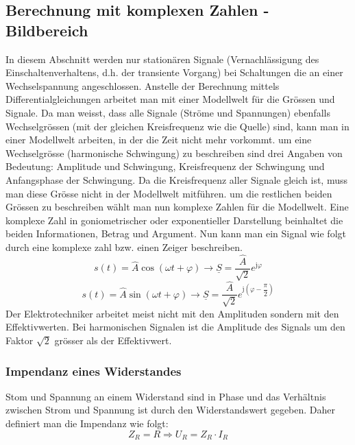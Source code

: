 \subsection{Berechnung mit komplexen Zahlen - Bildbereich}
In diesem Abschnitt werden nur stationären Signale (Vernachlässigung des Einschaltenverhaltens, d.h. der transiente Vorgang) bei Schaltungen die an einer Wechselspannung angeschlossen. Anstelle der Berechnung mittels Differentialgleichungen arbeitet man mit einer Modellwelt für die Grössen und Signale. Da man weisst, dass alle Signale (Ströme und Spannungen) ebenfalls Wechselgrössen (mit der gleichen Kreisfrequenz wie die Quelle) sind, kann man in einer Modellwelt arbeiten, in der die Zeit nicht mehr vorkommt. um eine Wechselgrösse (harmonische Schwingung) zu beschreiben sind drei Angaben von Bedeutung: Amplitude und Schwingung, Kreisfrequenz der Schwingung und Anfangsphase der Schwingung.
\newline\newline
Da die Kreisfrequenz aller Signale gleich ist, muss man diese Grösse nicht in der Modellwelt mitführen. um die restlichen beiden Grössen zu beschreiben wählt man nun komplexe Zahlen für die Modellwelt. Eine komplexe Zahl in goniometrischer oder exponentieller Darstellung beinhaltet die beiden Informationen, Betrag und Argument. Nun kann man ein Signal wie folgt durch eine komplexe zahl bzw. einen Zeiger beschreiben. 
\begin{equation}
\boxed{s\left(t\right)=\hat{A}\cos\left(\omega t+\varphi\right) \rightarrow \underline{S}=\dfrac{\hat{A}}{\sqrt{2}}e^{\text{j}\varphi}}
\end{equation}
\begin{equation}
\boxed{s\left(t\right)=\hat{A}\sin\left(\omega t+\varphi\right) \rightarrow \underline{S}=\dfrac{\hat{A}}{\sqrt{2}}e^{\text{j}\left(\varphi-\dfrac{\pi}{2}\right)}}
\end{equation}
Der Elektrotechniker arbeitet meist nicht mit den Amplituden sondern mit den Effektivwerten. Bei harmonischen Signalen ist die Amplitude des Signals um den Faktor $\sqrt{2}$ grösser als der Effektivwert.
\subsubsection{Impendanz eines Widerstandes}
Stom und Spannung an einem Widerstand sind in Phase und das Verhältnis zwischen Strom und Spannung ist durch den Widerstandswert gegeben. Daher definiert man die Impendanz wie folgt: 
\begin{equation}
\boxed{Z_R=R\Longrightarrow U_R=Z_R\cdot I_R}
\end{equation}
